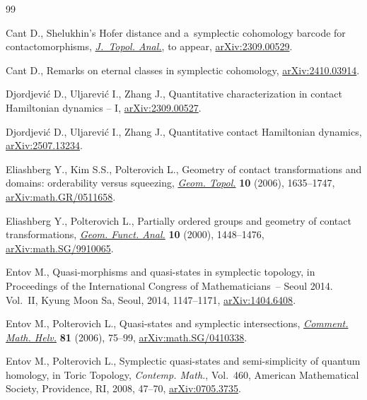 \documentclass[pdftex]{sigma}
\numberwithin{equation}{section}
\theoremstyle{definition}
\begin{document}
\begin{thebibliography}{99}
\footnotesize\itemsep=0pt

Cant D., Shelukhin's Hofer distance and a~symplectic cohomology barcode for
 contactomorphisms,
 \href{https://doi.org/10.1142/S179352532650010X}{\textit{J.~Topol. Anal.}}, {t}o appear, \href{http://arxiv.org/abs/2309.00529}{arXiv:2309.00529}.

Cant D., Remarks on eternal classes in symplectic cohomology,
 \href{http://arxiv.org/abs/2410.03914}{arXiv:2410.03914}.


Djordjevi\'c D., Uljarevi\'c I., Zhang J., Quantitative characterization in
 contact {H}amiltonian dynamics -- {I},
 \href{http://arxiv.org/abs/2309.00527}{arXiv:2309.00527}.

Djordjevi\'c D., Uljarevi\'c I., Zhang J., Quantitative contact {H}amiltonian
 dynamics, \href{http://arxiv.org/abs/2507.13234}{arXiv:2507.13234}.

Eliashberg Y., Kim S.S., Polterovich L., Geometry of contact transformations
 and domains: orderability versus squeezing,
 \href{https://doi.org/10.2140/gt.2006.10.1635}{\textit{Geom. Topol.}}
 \textbf{10} (2006), 1635--1747,
 \href{http://arxiv.org/abs/math.GR/0511658}{arXiv:math.GR/0511658}.

Eliashberg Y., Polterovich L., Partially ordered groups and geometry of contact
 transformations, \href{https://doi.org/10.1007/PL00001656}{\textit{Geom.
 Funct. Anal.}} \textbf{10} (2000), 1448--1476,
 \href{http://arxiv.org/abs/math.SG/9910065}{arXiv:math.SG/9910065}.

Entov M., Quasi-morphisms and quasi-states in symplectic topology, in
 Proceedings of the {I}nternational {C}ongress of {M}athematicians~-- {S}eoul
 2014. {V}ol.~{II}, Kyung Moon Sa, Seoul, 2014, 1147--1171,
 \href{http://arxiv.org/abs/1404.6408}{arXiv:1404.6408}.

Entov M., Polterovich L., Quasi-states and symplectic intersections,
 \href{https://doi.org/10.4171/CMH/43}{\textit{Comment. Math. Helv.}}
 \textbf{81} (2006), 75--99,
 \href{http://arxiv.org/abs/math.SG/0410338}{arXiv:math.SG/0410338}.

Entov M., Polterovich L., Symplectic quasi-states and semi-simplicity of
 quantum homology, in Toric Topology, \textit{Contemp. Math.}, Vol.~460,
American Mathematical Society,
 Providence, RI, 2008, 47--70,
 \href{http://arxiv.org/abs/0705.3735}{arXiv:0705.3735}.


\end{thebibliography}
\end{document}
